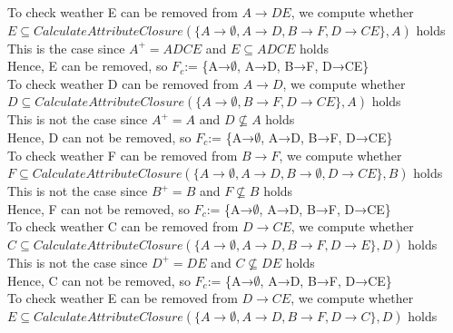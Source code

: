 \documentclass[]{article}
\begin{document}
	To check weather E can be removed from $A\rightarrow DE$, we compute whether $E\subseteq CalculateAttributeClosure(\{A\rightarrow \emptyset, A\rightarrow D, B\rightarrow F, D\rightarrow CE\}, A)$ holds \\
	
	This is the case since $A^{+} = ADCE$ and $E\subseteq ADCE$ holds  \\
	
	Hence, E can be removed, so $F_{c}$:= \{A→$\emptyset$, A→D, B→F, D→CE\} \\
	
	To check weather D can be removed from $A\rightarrow D$, we compute whether $D\subseteq CalculateAttributeClosure(\{A\rightarrow \emptyset, B\rightarrow F, D\rightarrow CE\}, A)$ holds \\
	
	This is not the case since $A^{+} = A$ and $D\not\subseteq A$ holds  \\
	
	Hence, D can not be removed, so $F_{c}$:= \{A→$\emptyset$, A→D, B→F, D→CE\} \\
	
	To check weather F can be removed from $B\rightarrow F$, we compute whether $F\subseteq CalculateAttributeClosure(\{A\rightarrow \emptyset, A\rightarrow D, B\rightarrow \emptyset, D\rightarrow CE\}, B)$ holds \\
	
	This is not the case since $B^{+} = B$ and $F\not\subseteq B$ holds  \\
	
	Hence, F can not be removed, so $F_{c}$:= \{A→$\emptyset$, A→D, B→F, D→CE\} \\
	
	To check weather C can be removed from $D\rightarrow CE$, we compute whether $C\subseteq CalculateAttributeClosure(\{A\rightarrow \emptyset, A\rightarrow D, B\rightarrow F, D\rightarrow E\}, D)$ holds \\
	
	This is not the case since $D^{+} = DE$ and $C\not\subseteq DE$ holds  \\
	
	Hence, C can not be removed, so $F_{c}$:= \{A→$\emptyset$, A→D, B→F, D→CE\} \\
	
	To check weather E can be removed from $D\rightarrow CE$, we compute whether $E\subseteq CalculateAttributeClosure(\{A\rightarrow \emptyset, A\rightarrow D, B\rightarrow F, D\rightarrow C\}, D)$ holds \\
	
\end{document}
